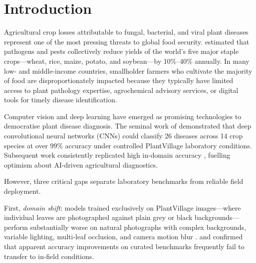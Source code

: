 \documentclass[pdflatex,sn-mathphys-num]{sn-jnl}
\begin{document}

\maketitle


\section{Introduction}
\label{sec:introduction}

Agricultural crop losses attributable to fungal, bacterial, and viral plant diseases
represent one of the most pressing threats to global food security. \citet{savary2019burden}
estimated that pathogens and pests collectively reduce yields of the world's five major
staple crops---wheat, rice, maize, potato, and soybean---by 10\%–40\% annually. In many
low- and middle-income countries, smallholder farmers who cultivate the majority of food
are disproportionately impacted because they typically have limited access to plant
pathology expertise, agrochemical advisory services, or digital tools for timely disease
identification.

Computer vision and deep learning have emerged as promising technologies to democratise
plant disease diagnosis. The seminal work of \citet{mohanty2016} demonstrated that deep
convolutional neural networks (CNNs) could classify 26 diseases across 14 crop species
at over 99\% accuracy under controlled PlantVillage \citep{hughes2015plantvillage}
laboratory conditions. Subsequent work consistently replicated high in-domain accuracy
\citep{ferentinos2018deep,chen2021identification,atila2021plant}, fuelling optimism about
AI-driven agricultural diagnostics.

However, three critical gaps separate laboratory benchmarks from reliable field
deployment.

First, \textit{domain shift}: models trained exclusively on PlantVillage images---where
individual leaves are photographed against plain grey or black backgrounds---perform
substantially worse on natural photographs with complex backgrounds, variable lighting,
multi-leaf occlusion, and camera motion blur \citep{barbedo2022review,singh2020plant,dsouza2021generalization}.
\citet{toda2019deep} and \citet{thapa2020plant} confirmed that apparent accuracy improvements
on curated benchmarks frequently fail to transfer to in-field conditions.
\end{document}
